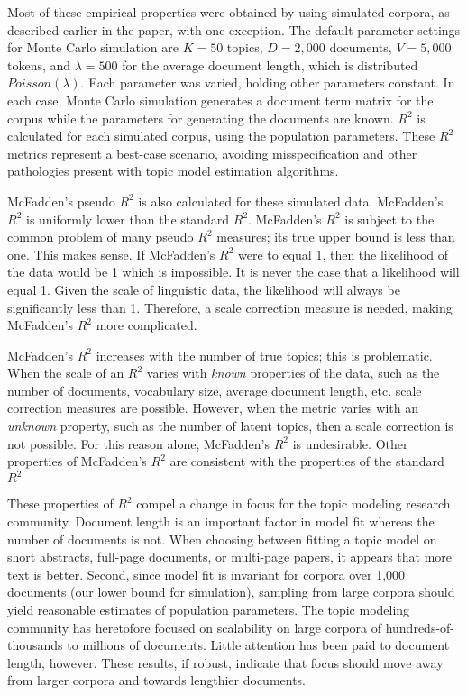\documentclass[conference,final,]{IEEEtran}
\begin{document}
Most of these empirical properties were obtained by using simulated
corpora, as described earlier in the paper, with one exception. The
default parameter settings for Monte Carlo simulation are \(K = 50\)
topics, \(D = 2,000\) documents, \(V = 5,000\) tokens, and
\(\lambda = 500\) for the average document length, which is distributed
\(Poisson(\lambda)\). Each parameter was varied, holding other
parameters constant. In each case, Monte Carlo simulation generates a
document term matrix for the corpus while the parameters for generating
the documents are known. \(R^2\) is calculated for each simulated
corpus, using the population parameters. These \(R^2\) metrics represent
a best-case scenario, avoiding misspecification and other pathologies
present with topic model estimation algorithms.

McFadden's pseudo \(R^2\) is also calculated for these simulated data.
McFadden's \(R^2\) is uniformly lower than the standard \(R^2\).
McFadden's \(R^2\) is subject to the common problem of many pseudo
\(R^2\) measures; its true upper bound is less than one. This makes
sense. If McFadden's \(R^2\) were to equal 1, then the likelihood of the
data would be 1 which is impossible. It is never the case that a
likelihood will equal 1. Given the scale of linguistic data, the
likelihood will always be significantly less than 1. Therefore, a scale
correction measure is needed, making McFadden's \(R^2\) more
complicated.

McFadden's \(R^2\) increases with the number of true topics; this is
problematic. When the scale of an \(R^2\) varies with \textit{known}
properties of the data, such as the number of documents, vocabulary
size, average document length, etc. scale correction measures are
possible. However, when the metric varies with an \textit{unknown}
property, such as the number of latent topics, then a scale correction
is not possible. For this reason alone, McFadden's \(R^2\) is
undesirable. Other properties of McFadden's \(R^2\) are consistent with
the properties of the standard \(R^2\)

These properties of \(R^2\) compel a change in focus for the topic
modeling research community. Document length is an important factor in
model fit whereas the number of documents is not. When choosing between
fitting a topic model on short abstracts, full-page documents, or
multi-page papers, it appears that more text is better. Second, since
model fit is invariant for corpora over 1,000 documents (our lower bound
for simulation), sampling from large corpora should yield reasonable
estimates of population parameters. The topic modeling community has
heretofore focused on scalability on large corpora of
hundreds-of-thousands to millions of documents. Little attention has
been paid to document length, however. These results, if robust,
indicate that focus should move away from larger corpora and towards
lengthier documents.
\end{document}
